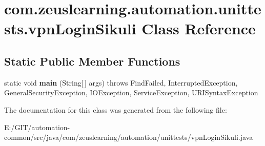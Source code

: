\hypertarget{classcom_1_1zeuslearning_1_1automation_1_1unittests_1_1vpnLoginSikuli}{}\section{com.\+zeuslearning.\+automation.\+unittests.\+vpn\+Login\+Sikuli Class Reference}
\label{classcom_1_1zeuslearning_1_1automation_1_1unittests_1_1vpnLoginSikuli}
\subsection*{Static Public Member Functions}
\begin{DoxyCompactItemize}
\item 
\hypertarget{classcom_1_1zeuslearning_1_1automation_1_1unittests_1_1vpnLoginSikuli_a9a517fd0e2328155d34dcc1f98123ecf}{}\label{classcom_1_1zeuslearning_1_1automation_1_1unittests_1_1vpnLoginSikuli_a9a517fd0e2328155d34dcc1f98123ecf} 
static void {\bfseries main} (String\mbox{[}$\,$\mbox{]} args)  throws Find\+Failed,             Interrupted\+Exception, General\+Security\+Exception, I\+O\+Exception,             Service\+Exception, U\+R\+I\+Syntax\+Exception 
\end{DoxyCompactItemize}


The documentation for this class was generated from the following file\+:\begin{DoxyCompactItemize}
\item 
E\+:/\+G\+I\+T/automation-\/common/src/java/com/zeuslearning/automation/unittests/vpn\+Login\+Sikuli.\+java\end{DoxyCompactItemize}
